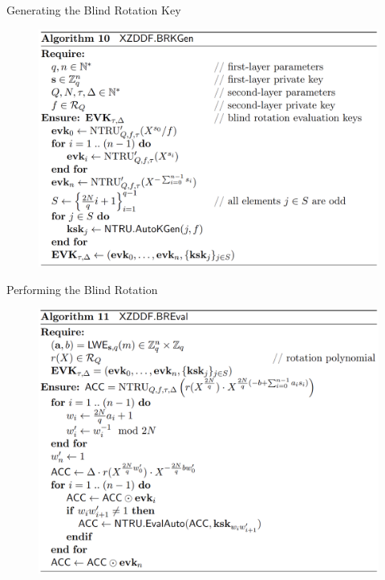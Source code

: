 \documentclass[aspectratio=169]{beamer}
\begin{document}
\begin{frame}{Generating the Blind Rotation Key}
    \begin{figure}
        \centering
        \includegraphics[scale=0.2]{data/brkgen.png}
        \label{fig:brkgen}
    \end{figure}
\end{frame}

\begin{frame}{Performing the Blind Rotation}
    \begin{figure}
        \centering
        \includegraphics[scale=0.21]{data/breval.png}
        \label{fig:breval}
    \end{figure}
\end{frame}
\end{document}
